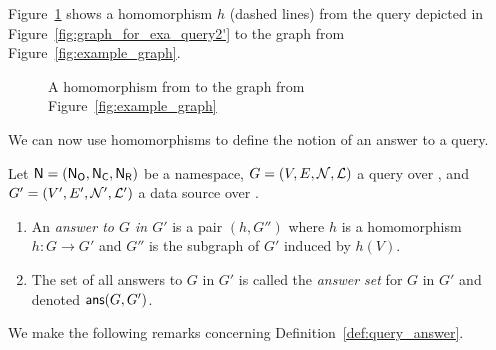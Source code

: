 Figure~\ref{fig:example_hmph} shows a homomorphism $h$ (dashed lines)
from the query depicted in Figure~\ref{fig:graph_for_exa_query2'}
to the graph from Figure~\ref{fig:example_graph}.

\newcommand{\tikzhmph}{%
  \begin{scope}[%
    every node/.style={draw=none,fill=none,inner sep=.2mm,align=left},
    every edge/.style={densely dashed,draw=black!70,thick}
  ]
    \path[->]
      (derev) edge                               node[above=.4mm,pos=.56] {\fns$h$} (work1)
      (y.0)   edge[shorten <= -1.5pt]            node[above=.4mm,pos=.16] {\fns$h$} ($(person2.north west)!(y.0)!(person2.south west)$)
    ;
    
    \draw[->,densely dashed,draw=black!70,thick,rounded corners=2mm]
      (x.south) |- node[above=.4mm,pos=.835] {\fns$h$} (item1.194)
    ; 

    \draw[->,densely dashed,draw=black!70,thick,rounded corners=2mm]
      ($(z.south) + (0, 1.5pt)$) |- node[above=.4mm,pos=.60] {\fns$h$} (person3.196)
    ; 
  \end{scope}
}

\begin{figure}[ht]
  \centering
  \caption{A homomorphism from  to the graph from Figure~\ref{fig:example_graph}}
  \label{fig:example_hmph}
\end{figure}

We can now use homomorphisms to define the notion of an answer to a query.
%
\begin{definition}
  \label{def:query_answer}
  Let $\textup{\textsf{N}}=(\mathsf{N}_\mathsf{O},\mathsf{N}_\mathsf{C},\mathsf{N}_\mathsf{R})$ be a namespace, $G = (V,E,\mathcal{N},\mathcal{L})$ a query over \namespace,
  and $G' = (V',E',\mathcal{N}',\mathcal{L}')$ a data source over \namespace.
  \begin{enumerate}
    \item
      An \emph{answer to $G$ in $G'$} is a pair $(h,G'')$
      where $h$ is a homomorphism $h : G \to G'$
      and $G''$ is the subgraph of $G'$ induced by $h(V)$.
    \item
      The set of all answers to $G$ in $G'$ is called the \emph{answer set} for $G$ in $G'$
      and denoted $\textsf{ans}(G,G')$.
  \end{enumerate}
\end{definition}
%
We make the following remarks concerning Definition~\ref{def:query_answer}.

